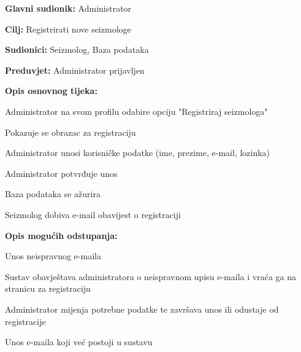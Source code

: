					\noindent {}
					\begin{packed_item}
	
						\item \textbf{Glavni sudionik:} Administrator
						\item \textbf{Cilj:} Registrirati nove seizmologe
						\item \textbf{Sudionici:} Seizmolog, Baza podataka
						\item \textbf{Preduvjet:} Administrator prijavljen
						\item \textbf{Opis osnovnog tijeka:}
						
						\item[] \begin{packed_enum}
	
							\item Administrator na svom profilu odabire opciju "Registriraj seizmologa"
							\item Pokazuje se obrazac za registraciju
							\item Administrator unosi korisničke podatke (ime, prezime, e-mail, lozinka)
							\item Administrator potvrđuje unos
							\item Baza podataka se ažurira
							\item Seizmolog dobiva e-mail obavijest o registraciji
						
						\end{packed_enum}
						
						\item  \textbf{Opis mogućih odstupanja:}
						
						\item[] \begin{packed_item}
	
							\item[3.a] Unos neispravnog e-maila
							\item[] \begin{packed_enum}
								
								\item Sustav obavještava administratora o neispravnom upisu e-maila i vraća ga na stranicu za registraciju
								\item Administrator mijenja potrebne podatke te završava unos ili odustaje od registracije
								\end{packed_enum}
							\item[3.b] Unos e-maila koji već postoji u sustavu
								\item[] \begin{packed_enum}
									

\end{packed_enum}
\end{packed_item}
\end{packed_item}
